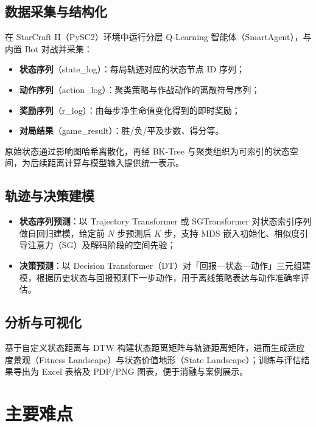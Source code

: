 \documentclass[UTF8,11pt]{ctexart}
\begin{document}
\subsection{数据采集与结构化}
在 StarCraft II（PySC2）环境中运行分层 Q-Learning 智能体（SmartAgent），与内置 Bot 对战并采集：
\begin{itemize}[leftmargin=*]
    \item \textbf{状态序列}（state\_log）：每局轨迹对应的状态节点 ID 序列；
    \item \textbf{动作序列}（action\_log）：聚类策略与作战动作的离散符号序列；
    \item \textbf{奖励序列}（r\_log）：由每步净生命值变化得到的即时奖励；
    \item \textbf{对局结果}（game\_result）：胜/负/平及步数、得分等。
\end{itemize}
原始状态通过影响图哈希离散化，再经 BK-Tree 与聚类组织为可索引的状态空间，为后续距离计算与模型输入提供统一表示。

\subsection{轨迹与决策建模}
\begin{itemize}[leftmargin=*]
    \item \textbf{状态序列预测}：以 Trajectory Transformer 或 SGTransformer 对状态索引序列做自回归建模，给定前 $N$ 步预测后 $K$ 步，支持 MDS 嵌入初始化、相似度引导注意力（SG）及解码阶段的空间先验；
    \item \textbf{决策预测}：以 Decision Transformer（DT）对「回报—状态—动作」三元组建模，根据历史状态与回报预测下一步动作，用于离线策略表达与动作准确率评估。
\end{itemize}

\subsection{分析与可视化}
基于自定义状态距离与 DTW 构建状态距离矩阵与轨迹距离矩阵，进而生成适应度景观（Fitness Landscape）与状态价值地形（State Landscape）；训练与评估结果导出为 Excel 表格及 PDF/PNG 图表，便于消融与案例展示。

\vspace{0.5em}

\section{主要难点}
\label{sec:difficulty}
\end{document}
